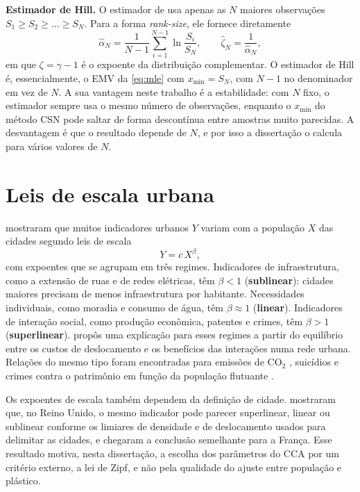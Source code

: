 \textbf{Estimador de Hill.} O estimador de  usa apenas as $N$ maiores observações $S_1 \geq S_2 \geq \dots \geq S_N$. Para a forma \textit{rank-size}, ele fornece diretamente
\begin{equation}
	\hat{\alpha}_N = \frac{1}{N - 1} \sum_{i=1}^{N-1} \ln \frac{S_i}{S_N},
	\qquad \hat{\zeta}_N = \frac{1}{\hat{\alpha}_N},
	\label{eq:hill}
\end{equation}
em que $\zeta = \gamma - 1$ é o expoente da distribuição complementar. O estimador de Hill é, essencialmente, o \gls{EMV} da \autoref{eq:mle} com $x_{\min} = S_N$, com $N-1$ no denominador em vez de $N$. A sua vantagem neste trabalho é a estabilidade: com $N$ fixo, o estimador sempre usa o mesmo número de observações, enquanto o $x_{\min}$ do método CSN pode saltar de forma descontínua entre amostras muito parecidas. A desvantagem é que o resultado depende de $N$, e por isso a dissertação o calcula para vários valores de $N$.

\section{Leis de escala urbana}
\label{sec:escala}

 mostraram que muitos indicadores urbanos $Y$ variam com a população $X$ das cidades segundo leis de escala
\begin{equation}
	Y = c\, X^{\beta},
	\label{eq:escala}
\end{equation}
com expoentes que se agrupam em três regimes. Indicadores de infraestrutura, como a extensão de ruas e de redes elétricas, têm $\beta < 1$ (\textbf{sublinear}): cidades maiores precisam de menos infraestrutura por habitante. Necessidades individuais, como moradia e consumo de água, têm $\beta \approx 1$ (\textbf{linear}). Indicadores de interação social, como produção econômica, patentes e crimes, têm $\beta > 1$ (\textbf{superlinear}).  propôs uma explicação para esses regimes a partir do equilíbrio entre os custos de deslocamento e os benefícios das interações numa rede urbana. Relações do mesmo tipo foram encontradas para emissões de CO$_2$ \cite{oliveira2014}, suicídios \cite{melo2014} e crimes contra o patrimônio em função da população flutuante \cite{caminha2017}.

Os expoentes de escala também dependem da definição de cidade.  mostraram que, no Reino Unido, o mesmo indicador pode parecer superlinear, linear ou sublinear conforme os limiares de densidade e de deslocamento usados para delimitar as cidades, e  chegaram a conclusão semelhante para a França. Esse resultado motiva, nesta dissertação, a escolha dos parâmetros do CCA por um critério externo, a lei de Zipf, e não pela qualidade do ajuste entre população e plástico.

